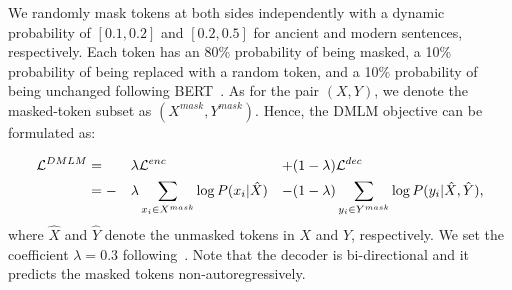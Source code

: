 We randomly mask tokens at both sides independently with a dynamic probability of $[0.1, 0.2]$ and $[0.2, 0.5]$ for ancient and modern sentences, respectively. Each token has an 80\% probability of being masked, a 10\% probability of being replaced with a random token, and a 10\% probability of being unchanged following BERT~\cite{DBLP:conf/naacl/DevlinCLT19}. As for the pair $(X, Y)$, we denote the masked-token subset as $(X^{mask}, Y^{mask})$. Hence, the DMLM objective can be formulated as:

\begin{equation}\label{eq:dmlm}
\begin{aligned}
\small
\mathcal{L}^{DMLM} & = &\lambda& \mathcal{L}^{enc} &+& (1-\lambda) \mathcal{L}^{dec} \\
& = - &\lambda& \sum_{x_i\in X^{mask}} \log{P(x_i | \hat{X})} &-& (1-\lambda) \sum_{y_i \in Y^{mask}} \log{P(y_i | \hat{X}, \hat{Y})},
\end{aligned}
\end{equation}
where $\hat{X}$ and $\hat{Y}$ denote the unmasked tokens in $X$ and $Y$, respectively. We set the coefficient $\lambda=0.3$ following~\cite{DBLP:conf/acl/LiLZWL22}. Note that the decoder is bi-directional and it predicts the masked tokens non-autoregressively.


 
   
    


